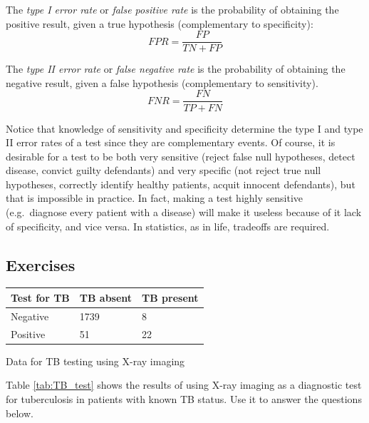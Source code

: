 \documentclass[
  letterpaper,
  DIV=11,
  numbers=noendperiod]{scrreprt}
\begin{document}
\begin{tcolorbox}[enhanced jigsaw, arc=.35mm, colframe=quarto-callout-note-color-frame, left=2mm, opacitybacktitle=0.6, breakable, title=\textcolor{quarto-callout-note-color}{\faInfo}\hspace{0.5em}{Definition}, toprule=.15mm, coltitle=black, bottomtitle=1mm, toptitle=1mm, colback=white, leftrule=.75mm, colbacktitle=quarto-callout-note-color!10!white, titlerule=0mm, opacityback=0, rightrule=.15mm, bottomrule=.15mm]

The \emph{type I error rate} or \emph{false positive rate} is the
probability of obtaining the positive result, given a true hypothesis
(complementary to specificity): \[FPR = \frac{FP}{TN+FP}\]

The \emph{type II error rate} or \emph{false negative rate} is the
probability of obtaining the negative result, given a false hypothesis
(complementary to sensitivity). \[FNR = \frac{FN}{TP+FN}\]

\end{tcolorbox}

Notice that knowledge of sensitivity and specificity determine the type
I and type II error rates of a test since they are complementary events.
Of course, it is desirable for a test to be both very sensitive (reject
false null hypotheses, detect disease, convict guilty defendants) and
very specific (not reject true null hypotheses, correctly identify
healthy patients, acquit innocent defendants), but that is impossible in
practice. In fact, making a test highly sensitive (e.g.~diagnose every
patient with a disease) will make it useless because of it lack of
specificity, and vice versa. In statistics, as in life, tradeoffs are
required.

\hypertarget{exercises-30}{%
\subsection{Exercises}\label{exercises-30}}

\begin{longtable}[]{@{}lll@{}}
\toprule()
Test for TB & TB absent & TB present \\
\midrule()
\endhead
Negative & 1739 & 8 \\
Positive & 51 & 22 \\
\bottomrule()
\end{longtable}

Data for TB testing using X-ray imaging

Table \ref{tab:TB_test} shows the results of using X-ray imaging as a
diagnostic test for tuberculosis in patients with known TB status. Use
it to answer the questions below.
\end{document}
